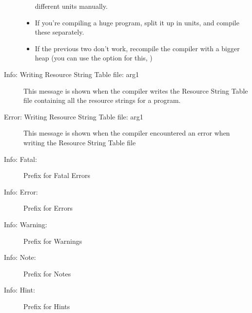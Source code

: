 \begin{description}
\begin{itemize}
 different units manually.
 \item If you're compiling a huge program, split it up in units, and compile
 these separately.
 \item If the previous two don't work, recompile the compiler with a bigger
 heap (you can use the  option for this, )
 \end{itemize}
\item [Info: Writing Resource String Table file: arg1]
 This message is shown when the compiler writes the Resource String Table
 file containing all the resource strings for a program.
\item [Error: Writing Resource String Table file: arg1]
 This message is shown when the compiler encountered an error when writing
 the Resource String Table file
\item [Info: Fatal:]
 Prefix for Fatal Errors
\item [Info: Error:]
 Prefix for Errors
\item [Info: Warning:]
 Prefix for Warnings
\item [Info: Note:]
 Prefix for Notes
\item [Info: Hint:]
 Prefix for Hints
 \end{description}
